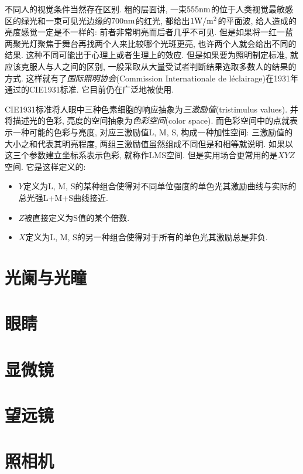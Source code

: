 不同人的视觉条件当然存在区别. 粗的层面讲, 一束$555{\rm nm}$的位于人类视觉最敏感区的绿光和一束可见光边缘的$700{\rm nm}$的红光, 都给出$1{\rm W/m^2}$的平面波, 给人造成的亮度感觉一定是不一样的: 前者非常明亮而后者几乎不可见. 但是如果将一红一蓝两聚光灯聚焦于舞台再找两个人来比较哪个光斑更亮, 也许两个人就会给出不同的结果. 这种不同可能出于心理上或者生理上的效应. 但是如果要为照明制定标准, 就应该克服人与人之间的区别, 一般采取从大量受试者判断结果选取多数人的结果的方式. 这样就有了\emph{国际照明协会}(Commission Internationale de l\ap\'eclairage)在1931年通过的CIE1931标准. 它目前仍在广泛地被使用.

CIE1931标准将人眼中三种色素细胞的响应抽象为\emph{三激励值}(tristimulus values). 并将描述光的色彩, 亮度的空间抽象为\emph{色彩空间}(color space). 而色彩空间中的点就表示一种可能的色彩与亮度, 对应三激励值L, M, S, 构成一种加性空间: 三激励值的大小之和代表其明亮程度, 两组三激励值虽然组成不同但是和相等就说明. 如果以这三个参数建立坐标系表示色彩, 就称作LMS空间. 但是实用场合更常用的是$XYZ$空间. 它是这样定义的:

\begin{itemize}
\item $Y$定义为L, M, S的某种组合使得对不同单位强度的单色光其激励曲线与实际的总光强L+M+S曲线接近.
\item $Z$被直接定义为S值的某个倍数.
\item $X$定义为L, M, S的另一种组合使得对于所有的单色光其激励总是非负.
\end{itemize}






\section{光阑与光瞳}

\section{眼睛}

\section{显微镜}

\section{望远镜}

\section{照相机}